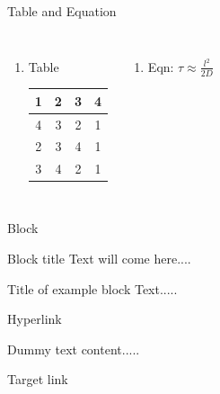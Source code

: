 \documentclass[12pt]{beamer}
\begin{document}
\begin{frame}{Table and Equation}
\begin{columns}[c]
\column{3in}
\begin{enumerate}
\item Table \qquad \begin{tabular}{c c c c}
\hline
1&2&3&4\\\hline
4&3&2&1\\\hline
2&3&4&1\\\hline
3&4&2&1\\\hline
\end{tabular}
\end{enumerate}
\column{3in}
\begin{enumerate}
\item Eqn: \qquad  $\tau \approx \frac{l^2}{2D}$
\end{enumerate}
\end{columns}
\end{frame}



\begin{frame}{Block}
\begin{block}{Block title}
Text will come here....
\end{block}
\vfill
\begin{exampleblock}{Title of example block}
Text.....
\end{exampleblock}
\end{frame}


\begin{frame}[label=mylink]{Hyperlink}
\hyperlink{chlink}{ }
\end{frame}


\begin{frame}{Dummy text}
content.....
\end{frame}


\begin{frame}[label=chlink]{Target link}
\hyperlink{mylink}{}
\footnotesize\lipsum[1]
\end{frame}


\end{document}
